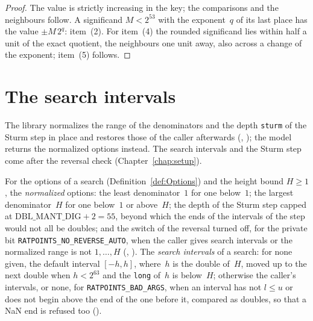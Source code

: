 \begin{proof}
  \leanok
  The value is strictly increasing in the key; the comparisons and the neighbours follow. A
  significand $M < 2^{53}$ with the exponent~$q$ of its last place has the value $\pm M\,2^q$:
  item~(2). For item~(4) the rounded significand lies within half a unit of the exact quotient, the
  neighbours one unit away, also across a change of the exponent; item~(5) follows.
\end{proof}

\section{The search intervals}\label{sec:searchIntervals}

The library normalizes the range of the denominators and the depth \verb|sturm| of the Sturm step
in place and restores those of the caller afterwards (,
); the model returns the normalized options instead. The search
intervals and the Sturm step come after the reversal check (Chapter~\ref{chap:setup}).

\begin{definition}\label{def:searchIntervals}
  \leanok
  For the options of a search (Definition~\ref{def:Options}) and the height bound $H \ge 1$, the
  \emph{normalized} options: the least denominator~$1$ for one below~$1$; the largest
  denominator~$H$ for one below~$1$ or above~$H$; the depth of the Sturm step capped at
  $\mathrm{DBL\_MANT\_DIG} + 2 = 55$, beyond which the ends of the intervals of the step would not
  all be doubles; and the switch of the reversal turned off, for the private bit
  \verb|RATPOINTS_NO_REVERSE_AUTO|, when the caller gives search intervals or the normalized range
  is not $1, \dots, H$ (, ).
  The \emph{search intervals} of a search: for none given, the default interval $[-h, h]$, where~$h$
  is the double of~$H$, moved up to the next double when $h < 2^{63}$ and the \verb|long| of~$h$ is
  below~$H$; otherwise the caller's intervals, or none, for \verb|RATPOINTS_BAD_ARGS|, when an
  interval has not $l \le u$ or does not begin above the end of the one before it, compared as
  doubles, so that a NaN end is refused too ().
\end{definition}

